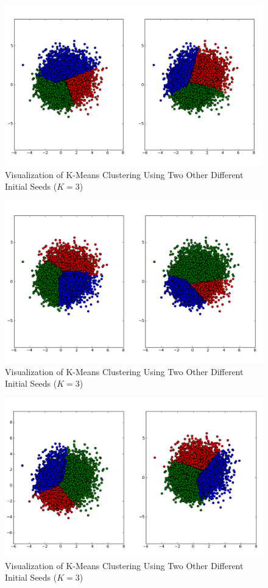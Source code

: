 \begin{itemize}
\begin{figure}[htb]
\centering
\includegraphics[width=12cm]{F42.png}
\caption{Visualization of K-Means Clustering Using Two Other Different Initial Seeds ($K=3$)}
\label{F42}
\end{figure}

\begin{figure}[htb]
\centering
\includegraphics[width=12cm]{F43.png}
\caption{Visualization of K-Means Clustering Using Two Other Different Initial Seeds ($K=3$)}
\label{F43}
\end{figure}

\begin{figure}[htb]
\centering
\includegraphics[width=12cm]{F44.png}
\caption{Visualization of K-Means Clustering Using Two Other Different Initial Seeds ($K=3$)}
\label{F44}
\end{figure}


\end{itemize}
